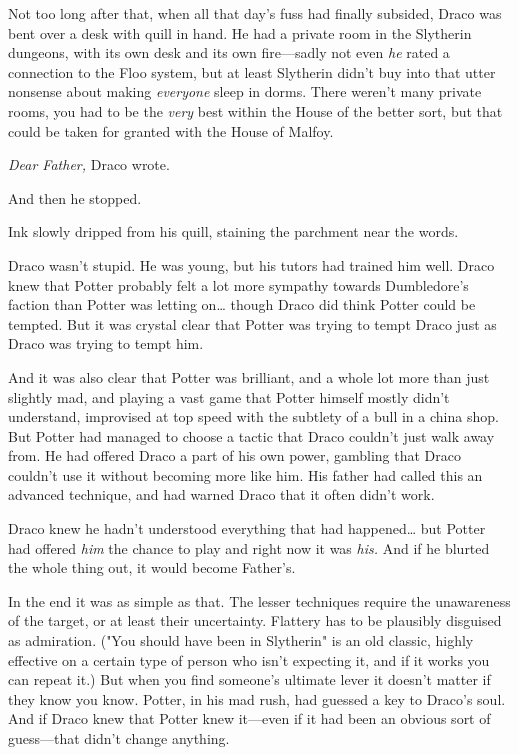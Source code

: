 Not too long after that, when all that day's fuss had finally subsided, Draco
was bent over a desk with quill in hand. He had a private room in the Slytherin
dungeons, with its own desk and its own fire---sadly not even \emph{he} rated a
connection to the Floo system, but at least Slytherin didn't buy into that
utter nonsense about making \emph{everyone} sleep in dorms. There weren't many
private rooms, you had to be the \emph{very} best within the House of the
better sort, but that could be taken for granted with the House of Malfoy.

\emph{Dear Father,} Draco wrote.

And then he stopped.

Ink slowly dripped from his quill, staining the parchment near the words.

Draco wasn't stupid. He was young, but his tutors had trained him well. Draco
knew that Potter probably felt a lot more sympathy towards Dumbledore's faction
than Potter was letting on{\ldots} though Draco did think Potter could be
tempted. But it was crystal clear that Potter was trying to tempt Draco just as
Draco was trying to tempt him.

And it was also clear that Potter was brilliant, and a whole lot more than just
slightly mad, and playing a vast game that Potter himself mostly didn't
understand, improvised at top speed with the subtlety of a bull in a china shop. But
Potter had managed to choose a tactic that Draco couldn't just walk away from.
He had offered Draco a part of his own power, gambling that Draco couldn't use
it without becoming more like him. His father had called this an advanced
technique, and had warned Draco that it often didn't work.

Draco knew he hadn't understood everything that had happened{\ldots} but Potter
had offered \emph{him} the chance to play and right now it was \emph{his.} And
if he blurted the whole thing out, it would become Father's.

In the end it was as simple as that. The lesser techniques require the
unawareness of the target, or at least their uncertainty. Flattery has to be
plausibly disguised as admiration. ("You should have been in Slytherin" is an
old classic, highly effective on a certain type of person who isn't expecting
it, and if it works you can repeat it.) But when you find someone's ultimate
lever it doesn't matter if they know you know. Potter, in his mad rush, had
guessed a key to Draco's soul. And if Draco knew that Potter knew it---even if
it had been an obvious sort of guess---that didn't change anything.

